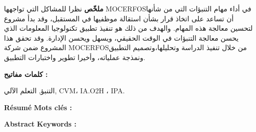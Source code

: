 \begin{changemargin}{3mm}{0cm}
    \begin{minipage}[c]{0.96\columnwidth}
        
        
        {\LARGE\textbf{ملخّص}}
        \vskip1mm
            \begingroup
            نظرا للمشاكل التي تواجهها MOCERFOSفي أداء مهام التنبؤات التي من شأنها أن تساعد على اتخاذ قرار بشأن استقالة موظفيها في المستقبل، وقد بدأ مشروع لتحسين معالجة هذه المهام. والهدف من ذلك هو تنفيذ تطبيق تكنولوجيا المعلومات الذي يحسن معالجة التنبؤات في الوقت الحقيقي، ويسهل ويحسن الإدارة. وقد تحقق هذا المشروع ضمن شركة MOCERFOSمن خلال تنفيذ الدراسة وتحليلها،وتصميم التطبيق ونمذجة عملياته، وأخيرا تطوير واختبارات التطبيق.
            \endgroup
        \vskip1mm
        {\textbf{كلمات مفاتيح : } 
      
              \begingroup
                 التنبؤ, التعلم الآلي,
          CVM، IA.O2H ، IPA.  
 \endgroup
        }
        
        {
        {%
            \vskip5mm
        }{\vskip8mm}}
        
        
        {\LARGE\textbf{Résumé}}
        \vskip1mm
            \begingroup
                \large
                \@frenchAbstract
            \endgroup
        \vskip1mm
        {\textbf{Mots clés : }
            \begingroup
                \@frenchAbstractKeywords
            \endgroup
        }
        
        {
        {%
            \vskip5mm
        }{\vskip8mm}}
        
        {\LARGE\textbf{Abstract}}
        \vskip1mm
            \begingroup
                \large
                \@englishAbstract
            \endgroup
        \vskip1mm
        {\textbf{Keywords : }
            \begingroup
                \@englishAbstractKeywords
            \endgroup
        }
    \end{minipage}
    
\end{changemargin}